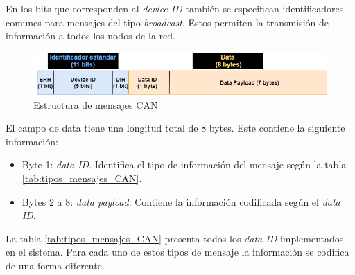 En los bits que corresponden al \textit{device ID} también se especifican identificadores comunes para mensajes del tipo \textit{broadcast}. Estos permiten la transmisión de información a todos los nodos de la red.

\begin{figure}[h!]
	\centering
	\includegraphics[width=1\linewidth ,height=0.12\textheight]{./Figures/estructura_mensaje.png}
	\caption{Estructura de mensajes CAN}
	\label{fig:estructura_mensajes}
\end{figure}

El campo de data tiene una longitud total de 8 bytes. Este contiene la siguiente información:
\begin{itemize}
	\item Byte 1: \textit{data ID}. Identifica el tipo de información del mensaje según la tabla \ref{tab:tipos_mensajes_CAN}.
	\item Bytes 2 a 8: \textit{data payload}. Contiene la información codificada según el \textit{data ID}.
\end{itemize}

La tabla \ref{tab:tipos_mensajes_CAN} presenta todos los \textit{data ID} implementados en el sistema. Para cada uno de estos tipos de mensaje la información se codifica de una forma diferente.

